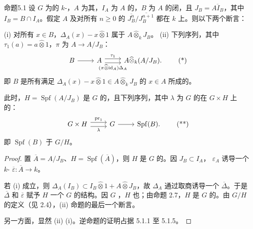 \begin{SGAresult}{命题}{5.1}
设 $G$ 为的 $k$-，$A$ 为其，$I_A$ 为 $A$ 的，$B$ 为 $A$ 的闭，且 $J_B=\overline{AI_B}$，其中 $I_B=B\cap I_A$。假定 $A$ 及对所有 $n\geq0$ 的 $\overline{J_B^n}/\overline{J_B^{n+1}}$ 都在 $k$ 上。则以下两个断言：

(i) 对所有 $x\in B$，$\Delta_A(x)-x\widehat\otimes1$ 属于 $A\widehat\otimes_k J_B$。
(ii) 下列序列，其中 $\tau_1(a)=a\widehat\otimes1$，$\pi$ 为 $A\to A/J_B$：
\[
\begin{tikzcd}
B\arrow[r]&A\arrow[r,shift left=.7ex,"\tau_1"]\arrow[r,shift right=.7ex,"(\pi\widehat\otimes\mathrm{id}_A)\Delta_A"']&A\widehat\otimes_k(A/J_B).
\end{tikzcd}\tag{*}
\]
即 $B$ 是所有满足 $\Delta_A(x)-x\widehat\otimes1\in A\widehat\otimes_kJ_B$ 的 $x\in A$ 所成的。

此时，$H=\operatorname{Spf}(A/J_B)$ 是 $G$ 的，且下列序列，其中 $\lambda$ 为 $G$ 的在 $G\times H$ 上的：
\[
\begin{tikzcd}
G\times H\arrow[r,shift left=.7ex,"\operatorname{pr}_1"]\arrow[r,shift right=.7ex,"\lambda"']&G\arrow[r]&\operatorname{Spf}(B).
\end{tikzcd}\tag{**}
\]
即 $\operatorname{Spf}(B)$ 于 $G/H$。
\end{SGAresult}
\begin{proof}
置 $\overline A=A/J_B$、$H=\operatorname{Spf}(\overline A)$，则 $H$ 是 $G$ 的。因 $J_B\subset I_A$， $\varepsilon_A$ 诱导一个 $k$- $\overline\varepsilon:\overline A\to k$。

若 (i) 成立，则 $\Delta_A(I_B)\subset I_B\widehat\otimes1+A\widehat\otimes J_B$，故 $\Delta_A$ 通过取商诱导一个 $\overline\Delta$。于是 $\overline\Delta$ 和 $\overline\varepsilon$ 赋予 $H$ 一个 $G$ 的结构。因 $G$ ，$H$ 也；由命题 2.7，$H$ 是 $G$ 的。由 $G/H$ 的定义（见 2.4），(ii) 命题的最后一个断言。

另一方面，显然 (ii)  (i)。逆命题的证明占据 5.1.1 至 5.1.5。
\end{proof}

